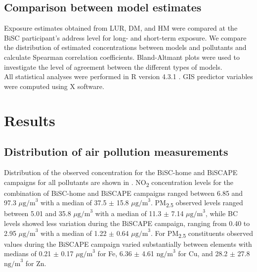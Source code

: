 \documentclass{article}
\begin{document}
\subsection{Comparison between model estimates}
Exposure estimates obtained from LUR, DM, and HM were compared at the BiSC participant's address level for long- and short-term exposure. We compare the distribution of estimated concentrations between models and pollutants and calculate Spearman correlation coefficients. Bland-Altmant plots were used to investigate the level of agreement between the different types of models. \\  

All statistical analyses were performed in R version 4.3.1 \cite{Rstudio}. GIS predictor variables were computed using X software. 

\section{Results}

\subsection{Distribution of air pollution measurements}

Distribution of the observed concentration for the BiSC-home and BiSCAPE campaigns for all pollutants are shown in . NO\textsubscript{2} concentration levels for the combination of BiSC-home and BiSCAPE campaigns ranged between 6.85 and 97.3 \(\mu \text{g/m}^3\) with a median of  37.5 \(\pm\) 15.8 \( \mu \text{g/m}^3\). PM\textsubscript{2.5} observed levels ranged between 5.01 and 35.8 \( \mu \text{g/m}^3\) with a median of 11.3 \(\pm\) 7.14 \(\mu \text{g/m}^3\), while BC levels showed less variation during the BiSCAPE campaign, ranging from 0.40 to 2.95 \(  \mu \text{g/m}^3\) with a median of 1.22 \(\pm\) 0.64 \( \mu \text{g/m}^3\). For PM\textsubscript{2.5} constituents  observed values during the BiSCAPE campaign varied substantially between elements with medians of 0.21 \(\pm\) 0.17 \(  \mu \text{g/m}^3\)  for  Fe,  6.36 \(\pm\) 4.61 \( \text{ng/m}^3 \) for Cu, and 28.2 \(\pm\) 27.8 \( \text{ng/m}^3 \) for Zn. 
\end{document}
